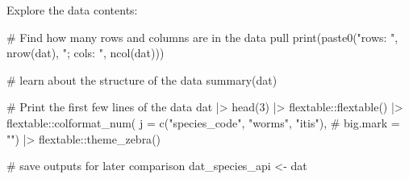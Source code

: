\documentclass[
  letterpaper,
  oneside,
  open=any]{scrbook}
\newenvironment{Shaded}{\begin{snugshade}}{\end{snugshade}}
\newcommand{\AttributeTok}[1]{\textcolor[rgb]{0.40,0.45,0.13}{#1}}
\newcommand{\CommentTok}[1]{\textcolor[rgb]{0.37,0.37,0.37}{#1}}
\newcommand{\DecValTok}[1]{\textcolor[rgb]{0.68,0.00,0.00}{#1}}
\newcommand{\DocumentationTok}[1]{\textcolor[rgb]{0.37,0.37,0.37}{\textit{#1}}}
\newcommand{\FunctionTok}[1]{\textcolor[rgb]{0.28,0.35,0.67}{#1}}
\newcommand{\NormalTok}[1]{\textcolor[rgb]{0.00,0.23,0.31}{#1}}
\newcommand{\OtherTok}[1]{\textcolor[rgb]{0.00,0.23,0.31}{#1}}
\newcommand{\SpecialCharTok}[1]{\textcolor[rgb]{0.37,0.37,0.37}{#1}}
\newcommand{\StringTok}[1]{\textcolor[rgb]{0.13,0.47,0.30}{#1}}
\begin{document}
\begin{Shaded}
\end{Shaded}

Explore the data contents:

\begin{Shaded}
\begin{Highlighting}[]
\CommentTok{\# Find how many rows and columns are in the data pull}
\FunctionTok{print}\NormalTok{(}\FunctionTok{paste0}\NormalTok{(}\StringTok{"rows: "}\NormalTok{, }\FunctionTok{nrow}\NormalTok{(dat), }\StringTok{"; cols: "}\NormalTok{, }\FunctionTok{ncol}\NormalTok{(dat)))}

\CommentTok{\# learn about the structure of the data}
\FunctionTok{summary}\NormalTok{(dat)}

\CommentTok{\# Print the first few lines of the data }
\NormalTok{dat }\SpecialCharTok{|\textgreater{}} 
  \FunctionTok{head}\NormalTok{(}\DecValTok{3}\NormalTok{) }\SpecialCharTok{|\textgreater{}} 
\NormalTok{  flextable}\SpecialCharTok{::}\FunctionTok{flextable}\NormalTok{() }\SpecialCharTok{|\textgreater{}}
\NormalTok{  flextable}\SpecialCharTok{::}\FunctionTok{colformat\_num}\NormalTok{(}
      \AttributeTok{j =} \FunctionTok{c}\NormalTok{(}\StringTok{"species\_code"}\NormalTok{, }\StringTok{"worms"}\NormalTok{, }\StringTok{"itis"}\NormalTok{), }\CommentTok{\# }
      \AttributeTok{big.mark =} \StringTok{""}\NormalTok{) }\SpecialCharTok{|\textgreater{}} 
\NormalTok{  flextable}\SpecialCharTok{::}\FunctionTok{theme\_zebra}\NormalTok{()}

\CommentTok{\# save outputs for later comparison}
\NormalTok{dat\_species\_api }\OtherTok{\textless{}{-}}\NormalTok{ dat}
\end{Highlighting}
\end{Shaded}
\end{document}
